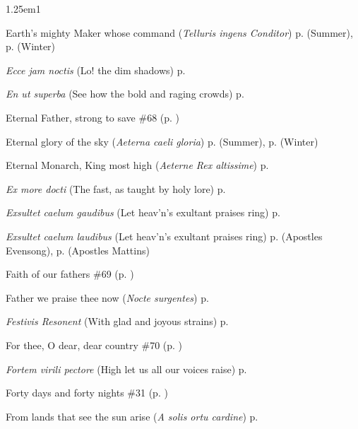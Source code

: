 \begin{hangparas}{1.25em}{1}
\par\noindent
Earth's mighty Maker whose command (\textit{Telluris ingens Conditor}) \dotfill p. \pageref{TuesdayEvensongSummer} (Summer), p. \pageref{TuesdayEvensongWinter} (Winter)
\par\noindent
\textit{Ecce jam noctis} (Lo! the dim shadows) \dotfill p. \pageref{SundayMattinsSummer}
\par\noindent
\textit{En ut superba} (See how the bold and raging crowds) \dotfill p. \pageref{CompassionInvitatory}
\par\noindent
Eternal Father, strong to save \dotfill \#68 (p. \pageref{Hymn68})
\par\noindent
Eternal glory of the sky (\textit{Aeterna caeli gloria}) \dotfill p. \pageref{FridayMattinsSummer} (Summer), p. \pageref{FridayMattinsWinter} (Winter)
\par\noindent
Eternal Monarch, King most high (\textit{Aeterne Rex altissime}) \dotfill p. \pageref{AscensionInvitatoryHymn}
\par\noindent
\textit{Ex more docti} (The fast, as taught by holy lore) \dotfill p. \pageref{FirstLentInvitatoryHymn}
\par\noindent
\textit{Exsultet caelum gaudibus} (Let heav'n's exultant praises ring) \dotfill p. \pageref{JohnMattinsHymn}
\par\noindent
\textit{Exsultet caelum laudibus} (Let heav'n's exultant praises ring) \dotfill p. \pageref{ApostlesEvensong} (Apostles Evensong), p. \pageref{ApostlesMattins} (Apostles Mattins)
\par\noindent
Faith of our fathers \dotfill \#69 (p. \pageref{Hymn69})
\par\noindent
Father we praise thee now (\textit{Nocte surgentes}) \dotfill p. \pageref{SundayInvitatorySummer}
\par\noindent
\textit{Festivis Resonent} (With glad and joyous strains) \dotfill p. \pageref{PreciousBloodEvensong}
\par\noindent
For thee, O dear, dear country \dotfill \#70 (p. \pageref{Hymn70})
\par\noindent
\textit{Fortem virili pectore} (High let us all our voices raise) \dotfill p. \pageref{MartyressNotVirginMattins}
\par\noindent
Forty days and forty nights \dotfill \#31 (p. \pageref{Hymn31})
\par\noindent
From lands that see the sun arise (\textit{A solis ortu cardine}) \dotfill p. \pageref{ChristmasMattinsHymn}
\par\noindent

\end{hangparas}
